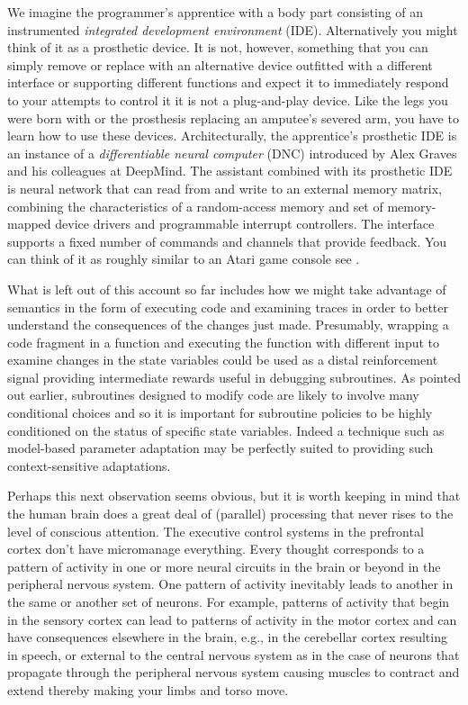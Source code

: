 We imagine the programmer's apprentice with a body part consisting of an instrumented {\it{integrated development environment}} (IDE). Alternatively you might think of it as a prosthetic device. It is not, however, something that you can simply remove or replace with an alternative device outfitted with a different interface or supporting different functions and expect it to immediately respond to your attempts to control it \emdash{} it is not a plug-and-play device. Like the legs you were born with or the prosthesis replacing an amputee's severed arm, you have to learn how to use these devices. Architecturally, the apprentice's prosthetic IDE is an instance of a {\it{differentiable neural computer}} (DNC) introduced by Alex Graves and his colleagues at DeepMind. The assistant combined with its prosthetic IDE is neural network that can read from and write to an external memory matrix, combining the characteristics of a random-access memory and set of memory-mapped device drivers and programmable interrupt controllers. The interface supports a fixed number of commands and channels that provide feedback. You can think of it as roughly similar to an Atari game console \emdash{} see {{}}.

What is left out of this account so far includes how we might take advantage of semantics in the form of executing code and examining traces in order to better understand the consequences of the changes just made. Presumably, wrapping a code fragment in a function and executing the function with different input to examine changes in the state variables could be used as a distal reinforcement signal providing intermediate rewards useful in debugging subroutines. As pointed out earlier, subroutines designed to modify code are likely to involve many conditional choices and so it is important for subroutine policies to be highly conditioned on the status of specific state variables. Indeed a technique such as model-based parameter adaptation may be perfectly suited to providing such context-sensitive adaptations.

Perhaps this next observation seems obvious, but it is worth keeping in mind that the human brain does a great deal of (parallel) processing that never rises to the level of conscious attention. The executive control systems in the prefrontal cortex don't have micromanage everything. Every thought corresponds to a pattern of activity in one or more neural circuits in the brain or beyond in the peripheral nervous system. One pattern of activity inevitably leads to another in the same or another set of neurons. For example, patterns of activity that begin in the sensory cortex can lead to patterns of activity in the motor cortex and can have consequences elsewhere in the brain, e.g., in the cerebellar cortex resulting in speech, or external to the central nervous system as in the case of neurons that propagate through the peripheral nervous system causing muscles to contract and extend thereby making your limbs and torso move. 

